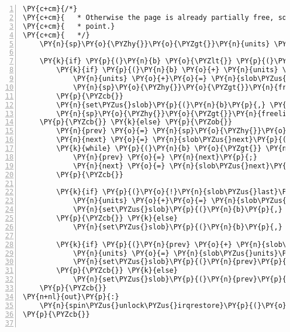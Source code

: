 \begin{Verbatim}[commandchars=\\\{\},numbers=left,firstnumber=1,stepnumber=1]
	\PY{c+cm}{/*}
\PY{c+cm}{	 * Otherwise the page is already partially free, so find reinsertion}
\PY{c+cm}{	 * point.}
\PY{c+cm}{	 */}
	\PY{n}{sp}\PY{o}{\PYZhy{}}\PY{o}{\PYZgt{}}\PY{n}{units} \PY{o}{+}\PY{o}{=} \PY{n}{units}\PY{p}{;}

	\PY{k}{if} \PY{p}{(}\PY{n}{b} \PY{o}{\PYZlt{}} \PY{p}{(}\PY{k+kt}{slob\PYZus{}t} \PY{o}{*}\PY{p}{)}\PY{n}{sp}\PY{o}{\PYZhy{}}\PY{o}{\PYZgt{}}\PY{n}{freelist}\PY{p}{)} \PY{p}{\PYZob{}}
		\PY{k}{if} \PY{p}{(}\PY{n}{b} \PY{o}{+} \PY{n}{units} \PY{o}{=}\PY{o}{=} \PY{n}{sp}\PY{o}{\PYZhy{}}\PY{o}{\PYZgt{}}\PY{n}{freelist}\PY{p}{)} \PY{p}{\PYZob{}}
			\PY{n}{units} \PY{o}{+}\PY{o}{=} \PY{n}{slob\PYZus{}units}\PY{p}{(}\PY{n}{sp}\PY{o}{\PYZhy{}}\PY{o}{\PYZgt{}}\PY{n}{freelist}\PY{p}{)}\PY{p}{;}
			\PY{n}{sp}\PY{o}{\PYZhy{}}\PY{o}{\PYZgt{}}\PY{n}{freelist} \PY{o}{=} \PY{n}{slob\PYZus{}next}\PY{p}{(}\PY{n}{sp}\PY{o}{\PYZhy{}}\PY{o}{\PYZgt{}}\PY{n}{freelist}\PY{p}{)}\PY{p}{;}
		\PY{p}{\PYZcb{}}
		\PY{n}{set\PYZus{}slob}\PY{p}{(}\PY{n}{b}\PY{p}{,} \PY{n}{units}\PY{p}{,} \PY{n}{sp}\PY{o}{\PYZhy{}}\PY{o}{\PYZgt{}}\PY{n}{freelist}\PY{p}{)}\PY{p}{;}
		\PY{n}{sp}\PY{o}{\PYZhy{}}\PY{o}{\PYZgt{}}\PY{n}{freelist} \PY{o}{=} \PY{n}{b}\PY{p}{;}
	\PY{p}{\PYZcb{}} \PY{k}{else} \PY{p}{\PYZob{}}
		\PY{n}{prev} \PY{o}{=} \PY{n}{sp}\PY{o}{\PYZhy{}}\PY{o}{\PYZgt{}}\PY{n}{freelist}\PY{p}{;}
		\PY{n}{next} \PY{o}{=} \PY{n}{slob\PYZus{}next}\PY{p}{(}\PY{n}{prev}\PY{p}{)}\PY{p}{;}
		\PY{k}{while} \PY{p}{(}\PY{n}{b} \PY{o}{\PYZgt{}} \PY{n}{next}\PY{p}{)} \PY{p}{\PYZob{}}
			\PY{n}{prev} \PY{o}{=} \PY{n}{next}\PY{p}{;}
			\PY{n}{next} \PY{o}{=} \PY{n}{slob\PYZus{}next}\PY{p}{(}\PY{n}{prev}\PY{p}{)}\PY{p}{;}
		\PY{p}{\PYZcb{}}

		\PY{k}{if} \PY{p}{(}\PY{o}{!}\PY{n}{slob\PYZus{}last}\PY{p}{(}\PY{n}{prev}\PY{p}{)} \PY{o}{\PYZam{}}\PY{o}{\PYZam{}} \PY{n}{b} \PY{o}{+} \PY{n}{units} \PY{o}{=}\PY{o}{=} \PY{n}{next}\PY{p}{)} \PY{p}{\PYZob{}}
			\PY{n}{units} \PY{o}{+}\PY{o}{=} \PY{n}{slob\PYZus{}units}\PY{p}{(}\PY{n}{next}\PY{p}{)}\PY{p}{;}
			\PY{n}{set\PYZus{}slob}\PY{p}{(}\PY{n}{b}\PY{p}{,} \PY{n}{units}\PY{p}{,} \PY{n}{slob\PYZus{}next}\PY{p}{(}\PY{n}{next}\PY{p}{)}\PY{p}{)}\PY{p}{;}
		\PY{p}{\PYZcb{}} \PY{k}{else}
			\PY{n}{set\PYZus{}slob}\PY{p}{(}\PY{n}{b}\PY{p}{,} \PY{n}{units}\PY{p}{,} \PY{n}{next}\PY{p}{)}\PY{p}{;}

		\PY{k}{if} \PY{p}{(}\PY{n}{prev} \PY{o}{+} \PY{n}{slob\PYZus{}units}\PY{p}{(}\PY{n}{prev}\PY{p}{)} \PY{o}{=}\PY{o}{=} \PY{n}{b}\PY{p}{)} \PY{p}{\PYZob{}}
			\PY{n}{units} \PY{o}{=} \PY{n}{slob\PYZus{}units}\PY{p}{(}\PY{n}{b}\PY{p}{)} \PY{o}{+} \PY{n}{slob\PYZus{}units}\PY{p}{(}\PY{n}{prev}\PY{p}{)}\PY{p}{;}
			\PY{n}{set\PYZus{}slob}\PY{p}{(}\PY{n}{prev}\PY{p}{,} \PY{n}{units}\PY{p}{,} \PY{n}{slob\PYZus{}next}\PY{p}{(}\PY{n}{b}\PY{p}{)}\PY{p}{)}\PY{p}{;}
		\PY{p}{\PYZcb{}} \PY{k}{else}
			\PY{n}{set\PYZus{}slob}\PY{p}{(}\PY{n}{prev}\PY{p}{,} \PY{n}{slob\PYZus{}units}\PY{p}{(}\PY{n}{prev}\PY{p}{)}\PY{p}{,} \PY{n}{b}\PY{p}{)}\PY{p}{;}
	\PY{p}{\PYZcb{}}
\PY{n+nl}{out}\PY{p}{:}
	\PY{n}{spin\PYZus{}unlock\PYZus{}irqrestore}\PY{p}{(}\PY{o}{\PYZam{}}\PY{n}{slob\PYZus{}lock}\PY{p}{,} \PY{n}{flags}\PY{p}{)}\PY{p}{;}
\PY{p}{\PYZcb{}}


\end{Verbatim}
